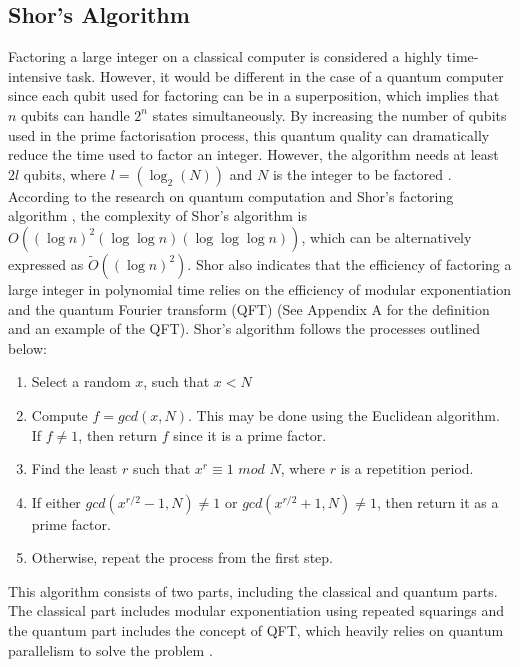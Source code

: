 \documentclass[12pt]{third-rep}
\begin{document}
\subsection{Shor's Algorithm}
Factoring a large integer on a classical computer is considered a highly time-intensive task. However, it would be different in the case of a quantum computer since each qubit used for factoring can be in a superposition, which implies that $n$ qubits can handle $2^n$ states simultaneously.  By increasing the number of qubits used in the prime factorisation process, this quantum quality can dramatically reduce the time used to factor an integer. However, the algorithm needs at least $2l$ qubits, where $l=(\log_2 (N))$ and $N$ is the integer to be factored \cite{shanghai}. According to the research on quantum computation and Shor's factoring algorithm \cite{cwi}, the complexity of Shor's algorithm is $O((\log n)^2(\log\log n)(\log\log\log n))$, which can be alternatively expressed as ${\tilde O}((\log n)^2)$. Shor also indicates that the efficiency of factoring a large integer in polynomial time relies on the efficiency of modular exponentiation and the quantum Fourier transform (QFT) (See Appendix A for the definition and an example of the QFT). Shor's algorithm follows the processes outlined below:
\begin{enumerate}
\item Select a random $x$, such that $x < N$
\item Compute $f = gcd(x,N)$. This may be done using the Euclidean algorithm. If $f\neq1$, then return $f$ since it is a prime factor.
\item Find the least $r$ such that $x^r\equiv1$ $mod$ $N$, where $r$ is a repetition period.
\item If either $gcd(x^{r/2}-1,N)\neq1$ or $gcd(x^{r/2}+1,N)\neq1$, then return it as a prime factor.
\item Otherwise, repeat the process from the first step.
\end{enumerate}
This algorithm consists of two parts, including the classical and quantum parts. The classical part includes modular exponentiation using repeated squarings and the quantum part includes the concept of QFT, which heavily relies on quantum parallelism to solve the problem \cite{mcgill}. 
\end{document}
